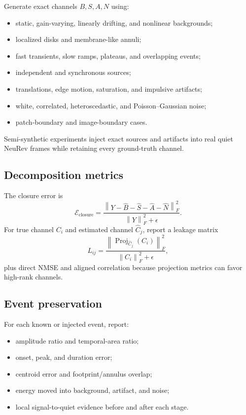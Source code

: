 \documentclass[11pt]{article}
\newcommand{\norm}[1]{\left\lVert#1\right\rVert}
\begin{document}
Generate exact channels $B,S,A,N$ using:
\begin{itemize}[leftmargin=*]
\item static, gain-varying, linearly drifting, and nonlinear backgrounds;
\item localized disks and membrane-like annuli;
\item fast transients, slow ramps, plateaus, and overlapping events;
\item independent and synchronous sources;
\item translations, edge motion, saturation, and impulsive artifacts;
\item white, correlated, heteroscedastic, and Poisson--Gaussian noise;
\item patch-boundary and image-boundary cases.
\end{itemize}
Semi-synthetic experiments inject exact sources and artifacts into real quiet
NeuRev frames while retaining every ground-truth channel.

\subsection{Decomposition metrics}

The closure error is
\begin{equation}
\mathcal E_{\mathrm{closure}}
=
\frac{\norm{Y-\widehat B-\widehat S-\widehat A-\widehat N}_F^2}
{\norm{Y}_F^2+\epsilon}.
\end{equation}
For true channel $C_i$ and estimated channel $\widehat C_j$, report a leakage
matrix
\begin{equation}
L_{ij}
=
\frac{\norm{\operatorname{Proj}_{\widehat C_j}(C_i)}_F^2}
{\norm{C_i}_F^2+\epsilon},
\end{equation}
plus direct NMSE and aligned correlation because projection metrics can favor
high-rank channels.

\subsection{Event preservation}

For each known or injected event, report:
\begin{itemize}[leftmargin=*]
\item amplitude ratio and temporal-area ratio;
\item onset, peak, and duration error;
\item centroid error and footprint/annulus overlap;
\item energy moved into background, artifact, and noise;
\item local signal-to-quiet evidence before and after each stage.
\end{itemize}
\end{document}
